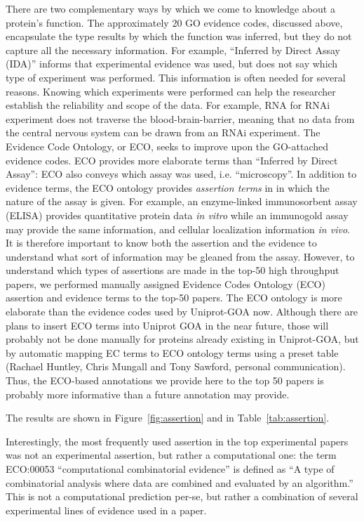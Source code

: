 \documentclass[12pt]{article}
\begin{document}
There are two complementary ways by which we come to knowledge about a protein's function. The
approximately 20 GO evidence codes, discussed above, encapsulate the type results by which the
function was inferred, but they do not capture all the necessary information. For example,
``Inferred by Direct Assay (IDA)'' informs that experimental evidence was used, but does not say
which type of experiment was performed. This information is often needed for several reasons.
Knowing which experiments were performed can help the researcher establish the reliability and
scope of the data. For example, RNA for RNAi experiment does not traverse the
blood-brain-barrier, meaning that no data from the central nervous system can be drawn from an
RNAi experiment. The Evidence Code Ontology, or ECO, seeks to improve upon the GO-attached
evidence codes. ECO provides more elaborate terms than ``Inferred by Direct Assay'': ECO also
conveys which assay was used, i.e.  ``microscopy''.  In addition to evidence terms, the ECO
ontology provides \textit{assertion terms} in in which the nature of the assay is given. For
example, an enzyme-linked immunosorbent assay (ELISA) provides quantitative protein data
\textit{in vitro} while an immunogold assay may provide the same information, and cellular
localization information \textit{in vivo}. It is therefore important to know both the assertion
and the evidence to understand what sort of information may be gleaned from the assay.  However,
to understand which types of assertions are made in the top-50 high throughput papers, we
performed manually assigned Evidence Codes Ontology (ECO) assertion and evidence terms to the
top-50 papers. The ECO ontology is more elaborate than the evidence codes used by Uniprot-GOA
now. Although there are plans to insert ECO terms into Uniprot GOA in the near future, those will
probably not be done manually for proteins already existing in Uniprot-GOA, but by automatic
mapping EC terms to ECO ontology terms using a preset table (Rachael Huntley, Chris Mungall  and
Tony Sawford, personal communication). Thus, the ECO-based annotations we provide here to the top
50 papers is probably more informative than a future annotation may provide.

The results are shown in Figure~\ref{fig:assertion} and in
Table~\ref{tab:assertion}.

Interestingly, the most frequently used assertion in the top experimental papers was not an
experimental assertion, but rather a computational one: the term ECO:00053 ``computational
combinatorial evidence'' is defined as ``A type of combinatorial analysis where data are
combined and evaluated by an algorithm.'' This is not a computational prediction per-se, but
rather a combination of several experimental lines of evidence used in a paper. 
\end{document}

